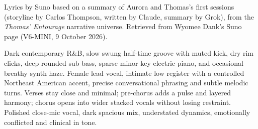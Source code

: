 
\label{sec:half-drawn-door}
\begin{notes}
Lyrics by Suno based on a summary of Aurora and Thomas's first sessions (storyline by Carlos Thompson, written by Claude, summary by Grok), from the \emph{Thomas' Entourage} narrative universe. Retrieved from Wyomee Dank's Suno page (V6-MINI, 9 October 2026).
\end{notes}
\begin{style}
Dark contemporary R\&B, slow swung half-time groove with muted kick, dry rim clicks, deep rounded sub-bass, sparse minor-key electric piano, and occasional breathy synth haze. Female lead vocal, intimate low register with a controlled Northeast American accent, precise conversational phrasing and subtle melodic turns. Verses stay close and minimal; pre-chorus adds a pulse and layered harmony; chorus opens into wider stacked vocals without losing restraint. Polished close-mic vocal, dark spacious mix, understated dynamics, emotionally conflicted and clinical in tone.
\end{style}
